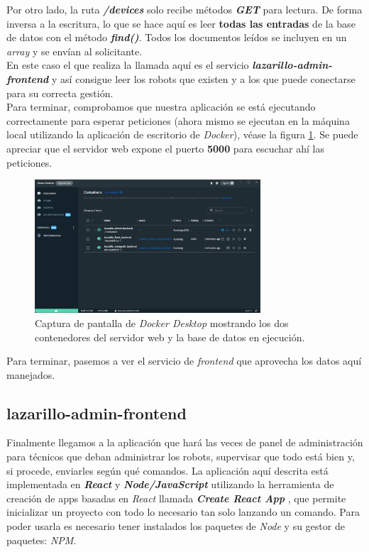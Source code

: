 Por otro lado, la ruta \textbf{\textit{/devices}} solo recibe métodos \textbf{\textit{GET}} para lectura. De forma inversa a la escritura, lo que se hace aquí es leer \textbf{todas las entradas} de la base de datos con el método \textbf{\textit{find()}}. Todos los documentos leídos se incluyen en un \textit{array} y se envían al solicitante.\\

En este caso el que realiza la llamada aquí es el servicio \textbf{\textit{lazarillo-admin-frontend}} y así consigue leer los robots que existen y a los que puede conectarse para su correcta gestión.\\

Para terminar, comprobamos que nuestra aplicación se está ejecutando correctamente para esperar peticiones (ahora mismo se ejecutan en la máquina local utilizando la aplicación de escritorio de \textit{Docker}), véase la figura \ref{docker-run}. Se puede apreciar que el servidor web expone el puerto \textbf{5000} para escuchar ahí las peticiones.\\

\begin{figure}[h]
	\centering
	\includegraphics[width=0.75\textwidth]{imagenes/docker-run.png}
	\caption{Captura de pantalla de \textit{Docker Desktop} mostrando los dos contenedores del servidor web y la base de datos en ejecución.}
	\label{docker-run}
\end{figure}

Para terminar, pasemos a ver el servicio de \textit{frontend} que aprovecha los datos aquí manejados.\\


\subsection{lazarillo-admin-frontend}

Finalmente llegamos a la aplicación que hará las veces de panel de administración para técnicos que deban administrar los robots, supervisar que todo está bien y, si procede, enviarles según qué comandos. La aplicación aquí descrita está implementada en \textbf{\textit{React}} y \textbf{\textit{Node/JavaScript}} utilizando la herramienta de creación de apps basadas en \textit{React} llamada \textbf{\textit{Create React App}} \cite{create-react-app}, que permite inicializar un proyecto con todo lo necesario tan solo lanzando un comando. Para poder usarla es necesario tener instalados los paquetes de \textit{Node} y su gestor de paquetes: \textit{NPM}.\\

